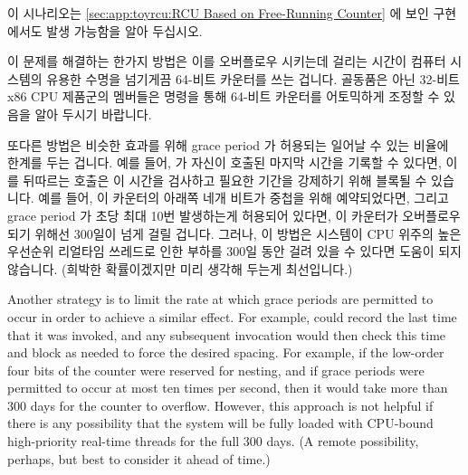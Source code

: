 {{\begin{enumerate}
	\fi

	\end{enumerate}

	이 시나리오는
	\cref{sec:app:toyrcu:RCU Based on Free-Running Counter}
	에 보인 구현에서도 발생 가능함을 알아 두십시오.

	이 문제를 해결하는 한가지 방법은 이를 오버플로우 시키는데 걸리는 시간이
	컴퓨터 시스템의 유용한 수명을 넘기게끔 64-비트 카운터를 쓰는 겁니다.
	골동품은 아닌 32-비트 x86 CPU 제품군의 멤버들은  명령을
	통해 64-비트 카운터를 어토믹하게 조정할 수 있음을 알아 두시기 바랍니다.

	\iffalse

	Note that scenario can also occur in the implementation presented in
	\cref{sec:app:toyrcu:RCU Based on Free-Running Counter}.

	One strategy for fixing this problem is to use 64-bit
	counters so that the time required to overflow them would exceed
	the useful lifetime of the computer system.
	Note that non-antique members of the 32-bit x86 CPU family
	allow atomic manipulation of 64-bit counters via the
	\co{cmpxchg64b} instruction.

	\fi

	또다른 방법은 비슷한 효과를 위해 grace period 가 허용되는 일어날 수
	있는 비율에 한계를 두는 겁니다.
	예를 들어,  가 자신이 호출된 마지막 시간을 기록할
	수 있다면, 이를 뒤따르는 호출은 이 시간을 검사하고 필요한 기간을
	강제하기 위해 블록될 수 있습니다.
	예를 들어, 이 카운터의 아래쪽 네개 비트가 중첩을 위해 예약되었다면,
	그리고 grace period 가 초당 최대 10번 발생하는게 허용되어 있다면, 이
	카운터가 오버플로우 되기 위해선 300일이 넘게 걸릴 겁니다.
	그러나, 이 방법은 시스템이 CPU 위주의 높은 우선순위 리얼타임 쓰레드로
	인한 부하를 300일 동안 걸려 있을 수 있다면 도움이 되지 않습니다.
	(희박한 확률이겠지만 미리 생각해 두는게 최선입니다.)

	\iffalse

	Another strategy is to limit the rate at which grace periods are
	permitted to occur in order to achieve a similar effect.
	For example,  could record the last time
	that it was invoked, and any subsequent invocation would then
	check this time and block as needed to force the desired
	spacing.
	For example, if the low-order four bits of the counter were
	reserved for nesting, and if grace periods were permitted to
	occur at most ten times per second, then it would take more
	than 300 days for the counter to overflow.
	However, this approach is not helpful if there is any possibility
	that the system will be fully loaded with CPU-bound high-priority
	real-time threads for the full 300 days.
	(A remote possibility, perhaps, but best to consider it ahead
	of time.)

}}
